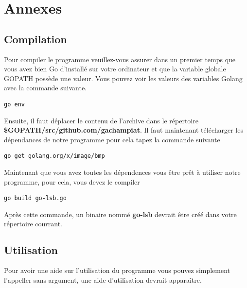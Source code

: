 \documentclass[letterpaper,12pt, french]{article}
\begin{document}
\section{Annexes}
\label{sec:org831bd28}

\subsection{Compilation}
\label{sec:orge5b0aab}
Pour compiler le programme veuillez-vous assurer dans un premier temps que vous avez bien Go d'installé sur votre ordinateur et que la variable globale GOPATH possède une valeur.
Vous pouvez voir les valeurs des variables Golang avec la commande suivante.

\begin{lstlisting}[language=bash]
go env
\end{lstlisting}
\vspace{1\baselineskip}
\space
Ensuite, il faut déplacer le contenu de l'archive dans le répertoire \textbf{\$GOPATH/src/github.com/gachampiat}. 
Il faut maintenant télécharger les dépendances de notre programme pour cela tapez la commande suivante

\begin{lstlisting}[language=bash]
go get golang.org/x/image/bmp
\end{lstlisting}
\vspace{1\baselineskip}
\space
Maintenant que vous avez toutes les dépendences vous être prêt à utiliser notre programme, pour cela, vous devez le compiler
\begin{lstlisting}[language=bash]
go build go-lsb.go
\end{lstlisting}
\vspace{1\baselineskip}
\space
Après cette commande, un binaire nommé \textbf{go-lsb} devrait être créé dans votre répertoire courrant.

\subsection{Utilisation}
\label{sec:orge5b0aab}
Pour avoir une aide sur l'utilisation du programme vous pouvez simplement l'appeller sans argument, une aide
d'utilisation devrait apparaître.
\end{document}
